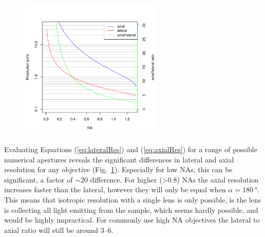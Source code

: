 
  \begin{figure}
    \centering
    \includegraphics[width=0.6\textwidth]{resolution}
    \label{fig:resolution}
  \end{figure}

  Evaluating Equations (\ref{eq:lateralRes}) and (\ref{eq:axialRes}) for a range of possible numerical apertures reveals the significant differences in lateral and axial resolution for any objective (Fig.~\ref{fig:resolution}). Especially for low NAs, this can be significant, a factor of $\sim$20 difference. For higher (>0.8) NAs the axial resolution increases faster than the lateral, however they will only be equal when $\alpha=\SI{180}{\degree}$. This means that isotropic resolution with a single lens is only possible, is the lens is collecting all light emitting from the sample, which seems hardly possible, and would be highly impractical. For commonly use high NA objectives the lateral to axial ratio will still be around 3--6. 

